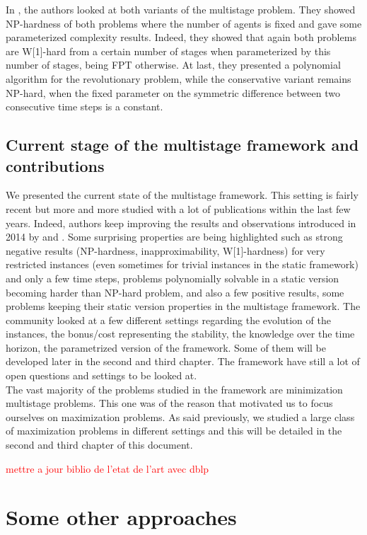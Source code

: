 \documentclass[a4paper]{book}
\newcommand{\alex}[2]{\textcolor{red}{#1}}
\begin{document}
In \cite{multicomm}, the authors looked at both variants of the multistage problem. They showed NP-hardness of both problems where the number of agents is fixed and gave some parameterized complexity results. Indeed, they showed that again both problems are W[1]-hard from a certain number of stages when parameterized by this number of stages, being FPT otherwise. At last, they presented a polynomial algorithm for the revolutionary problem, while the conservative variant remains NP-hard, when the fixed parameter on the symmetric difference between two consecutive time steps is a constant. 

\subsection{Current stage of the multistage framework and contributions}

We presented the current state of the multistage framework. This setting is fairly recent but more and more studied with a lot of publications within the last few years. Indeed, authors keep improving the results and observations introduced in 2014 by \cite{Gupta} and \cite{Eisenstat}. Some surprising properties are being highlighted such as strong negative results (NP-hardness, inapproximability, W[1]-hardness) for very restricted instances (even sometimes for trivial instances in the static framework) and only a few time steps, problems polynomially solvable in a static version becoming harder than NP-hard problem, and also a few positive results, some problems keeping their static version properties in the multistage framework. The community looked at a few different settings regarding the evolution of the instances, the bonus/cost representing the stability, the knowledge over the time horizon, the parametrized version of the framework. Some of them will be developed later in the second and third chapter. The framework have still a lot of open questions and settings to be looked at. \\
The vast majority of the problems studied in the framework are minimization multistage problems. This one was of the reason that motivated us to focus ourselves on maximization problems. As said previously, we studied a large class of maximization problems in different settings and this will be detailed in the second and third chapter of this document.


\alex{mettre a jour biblio de l'etat de l'art avec dblp}\\
\section{Some other approaches} \label{tempsota}
\end{document}

